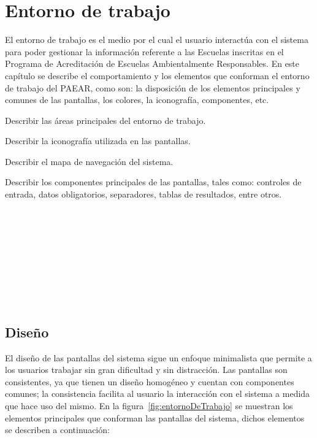 
\section{Entorno de trabajo}

    El entorno de trabajo es el medio por el cual el usuario interactúa con el sistema para poder gestionar la información referente a las Escuelas inscritas en el Programa de Acreditación de Escuelas Ambientalmente Responsables. En este capítulo se describe el comportamiento y los elementos que conforman el entorno de 
    trabajo del PAEAR, como son: la disposición de los elementos principales y comunes de las pantallas, los colores, la iconografía, componentes, etc. \bigskip

    \begin{objetivos}
      \item Describir las áreas principales del entorno de trabajo.
      \item Describir la iconografía utilizada en las pantallas.
      \item Describir el mapa de navegación del sistema.
      \item Describir los componentes principales de las pantallas, tales como: controles de entrada, datos obligatorios, separadores, tablas de resultados, entre otros.
    \end{objetivos}
\\\\\\\\\\\\\\\\

\subsection{Diseño}

  El diseño de las pantallas del sistema sigue un enfoque minimalista que permite a los usuarios trabajar sin gran dificultad y sin distracción. 
  Las pantallas son consistentes, ya que tienen un diseño homogéneo y cuentan con componentes comunes; la consistencia facilita al usuario la interacción
  con el sistema a medida que hace uso del mismo. En la figura~\ref{fig:entornoDeTrabajo} se muestran los elementos principales que conforman las pantallas del sistema, 
  dichos elementos se describen a continuación:

